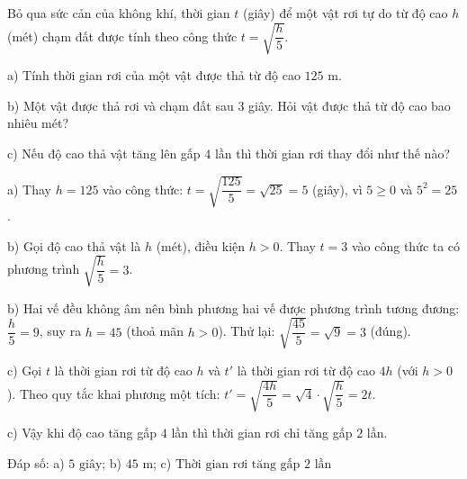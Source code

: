 \begin{problem}[9DS-CAN-012]
Bỏ qua sức cản của không khí, thời gian $t$ (giây) để một vật rơi tự do từ độ cao $h$ (mét) chạm đất được tính theo công thức $t = \sqrt{\dfrac{h}{5}}$.

a) Tính thời gian rơi của một vật được thả từ độ cao $125$ m.

b) Một vật được thả rơi và chạm đất sau $3$ giây. Hỏi vật được thả từ độ cao bao nhiêu mét?

c) Nếu độ cao thả vật tăng lên gấp $4$ lần thì thời gian rơi thay đổi như thế nào?

\begin{solution}
a) Thay $h = 125$ vào công thức: $t = \sqrt{\dfrac{125}{5}} = \sqrt{25} = 5$ (giây), vì $5 \geq 0$ và $5^2 = 25$.

b) Gọi độ cao thả vật là $h$ (mét), điều kiện $h > 0$. Thay $t = 3$ vào công thức ta có phương trình $\sqrt{\dfrac{h}{5}} = 3$.

b) Hai vế đều không âm nên bình phương hai vế được phương trình tương đương: $\dfrac{h}{5} = 9$, suy ra $h = 45$ (thoả mãn $h > 0$). Thử lại: $\sqrt{\dfrac{45}{5}} = \sqrt{9} = 3$ (đúng).

c) Gọi $t$ là thời gian rơi từ độ cao $h$ và $t'$ là thời gian rơi từ độ cao $4h$ (với $h > 0$). Theo quy tắc khai phương một tích: $t' = \sqrt{\dfrac{4h}{5}} = \sqrt{4} \cdot \sqrt{\dfrac{h}{5}} = 2t$.

c) Vậy khi độ cao tăng gấp $4$ lần thì thời gian rơi chỉ tăng gấp $2$ lần.

Đáp số: a) $\boxed{5 \text{ giây}}$; b) $\boxed{45 \text{ m}}$; c) $\boxed{\text{Thời gian rơi tăng gấp } 2 \text{ lần}}$
\end{solution}
\end{problem}

